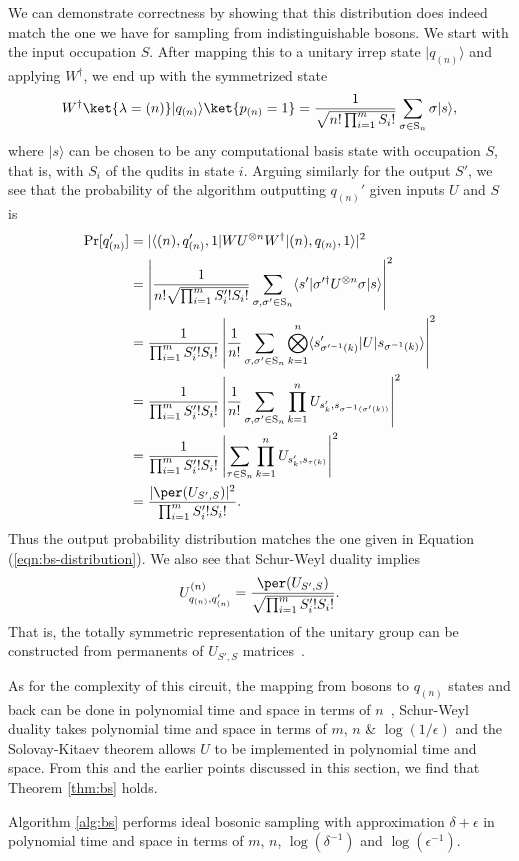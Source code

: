 We can demonstrate correctness by showing that this distribution does indeed match the one we have for sampling from indistinguishable bosons. 
We start with the input occupation $S$. 
After mapping this to a unitary irrep state $|q_{(n)}\rangle$ and applying $W^\dagger$, we end up with the symmetrized state
\begin{equation}\label{eq:IdealState}
W^\dagger\ket{\lambda=(n)}|q_{(n)}\rangle\ket{p_{(n)}=1}
 = \frac{1}{\sqrt{n! \prod_{i=1}^m S_i!}}\sum_{\sigma \in  \textrm{S}_n}\sigma|s\rangle ,
\end{equation}
where $|s\rangle$ can be chosen to be any computational basis state with occupation $S$, that is, with $S_i$ of the qudits in state $i$.
Arguing similarly for the output $S'$, we see that the probability of the algorithm outputting $q_{(n)}'$ given inputs $U$ and $S$ is
\begin{align}
\textrm{Pr}[q_{(n)}']
&= \vert \langle (n), q_{(n)}', 1\vert W U^{\otimes n} W^\dag |(n), q_{(n)}, 1\rangle \vert^2 \\
&= \left|\frac{1}{n!\sqrt{\prod_{i=1}^m S'_i! S_i!}}\sum_{\sigma, \sigma'\in \textrm{S}_n}\langle s'|{\sigma}'^\dag{U}^{\otimes n}{\sigma}|s\rangle\right|^2\\
&= \frac{1}{\prod_{i=1}^m S'_i! S_i!}\left|\frac{1}{n!}\sum_{\sigma, \sigma'\in \textrm{S}_n}\bigotimes_{k=1}^n \langle s'_{\sigma'^{-1}(k)}|{U}|s_{\sigma^{-1}(k)}\rangle\right|^2\\
&= \frac{1}{\prod_{i=1}^m S'_i! S_i!}\left|\frac{1}{n!}\sum_{\sigma, \sigma'\in \textrm{S}_n}\prod_{k=1}^n U_{s'_{k},s_{\sigma^{-1}(\sigma'(k))}}\right|^2\\
&= \frac{1}{\prod_{i=1}^m S'_i! S_i!}\left|\sum_{\tau \in \textrm{S}_n}\prod_{k=1}^n U_{s'_{k},s_{\tau(k)}}\right|^2\\
&= \frac{|\per(U_{S',S})|^2}{\prod_{i=1}^m S'_i! S_i!}.
\end{align}
Thus the output probability distribution matches the one given in Equation (\ref{eqn:bs-distribution}).
We also see that Schur-Weyl duality implies
\begin{equation}
U^{(n)}_{q_{(n)}, q_{(n)}'} = \frac{\per(U_{S',S})}{\sqrt{\prod_{i=1}^m S'_i! S_i!}}.
\label{eqn:symmetric_action}
\end{equation}
That is, the totally symmetric representation of the unitary group can be constructed from permanents of $U_{S',S}$ matrices~\cite{bhatia1997}.

As for the complexity of this circuit, the mapping from bosons to $q_{(n)}$ states and back can be done in polynomial time and space in terms of $n$~\cite{rowe1999}, Schur-Weyl duality takes polynomial time and space in terms of $m$, $n$ \& $\log(1/\epsilon)$ and the Solovay-Kitaev theorem allows $U$ to be implemented in polynomial time and space. 
From this and the earlier points discussed in this section, we find that Theorem \ref{thm:bs} holds.
\begin{theorem}
Algorithm \ref{alg:bs} performs ideal bosonic sampling with approximation $\delta+\epsilon$ in polynomial time and space in terms of $m$, $n$, $\log(\delta^{-1})$ and $\log(\epsilon^{-1})$.
\label{thm:bs}
\end{theorem}

